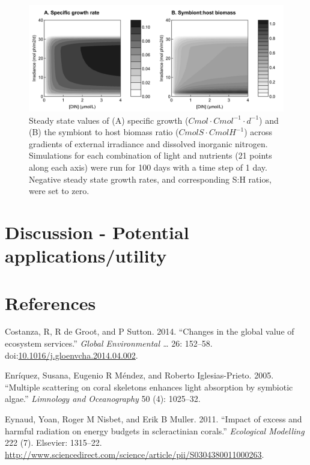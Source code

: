 \documentclass[]{elsarticle} %
\makeatletter
\def\maxwidth{\ifdim\Gin@nat@width>\linewidth\linewidth
\else\Gin@nat@width\fi}
\let\Oldincludegraphics\includegraphics
\renewcommand{\includegraphics}[1]{\Oldincludegraphics[width=\maxwidth]{#1}}
\makeatother
\begin{document}
\begin{figure}[htbp]
\centering
\includegraphics{../img/Fig2.png}
\caption{Steady state values of (A) specific growth
(\(Cmol \cdot Cmol^{-1} \cdot d^{-1}\)) and (B) the symbiont to host
biomass ratio (\(CmolS \cdot CmolH^{-1}\)) across gradients of external
irradiance and dissolved inorganic nitrogen. Simulations for each
combination of light and nutrients (21 points along each axis) were run
for 100 days with a time step of 1 day. Negative steady state growth
rates, and corresponding S:H ratios, were set to zero.}
\end{figure}

\section{Discussion - Potential
applications/utility}\label{discussion---potential-applicationsutility}

\section*{References}\label{references}

\hypertarget{refs}{}
\hypertarget{ref-Costanza:2014ex}{}
Costanza, R, R de Groot, and P Sutton. 2014. ``Changes in the global
value of ecosystem services.'' \emph{Global Environmental \ldots{}} 26:
152--58.
doi:\href{https://doi.org/10.1016/j.gloenvcha.2014.04.002}{10.1016/j.gloenvcha.2014.04.002}.

\hypertarget{ref-Enriquez:2005p142}{}
Enríquez, Susana, Eugenio R Méndez, and Roberto Iglesias-Prieto. 2005.
``Multiple scattering on coral skeletons enhances light absorption by
symbiotic algae.'' \emph{Limnology and Oceanography} 50 (4): 1025--32.

\hypertarget{ref-Eynaud:2011tv}{}
Eynaud, Yoan, Roger M Nisbet, and Erik B Muller. 2011. ``Impact of
excess and harmful radiation on energy budgets in scleractinian
corals.'' \emph{Ecological Modelling} 222 (7). Elsevier: 1315--22.
\url{http://www.sciencedirect.com/science/article/pii/S0304380011000263}.
\end{document}
